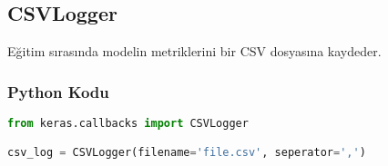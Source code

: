\newpage

\subsection{CSVLogger}
Eğitim sırasında modelin metriklerini bir CSV dosyasına kaydeder.

\subsubsection{Python Kodu}

\begin{lstlisting}[language=Python]
from keras.callbacks import CSVLogger

csv_log = CSVLogger(filename='file.csv', seperator=',')
\end{lstlisting}

\newpage